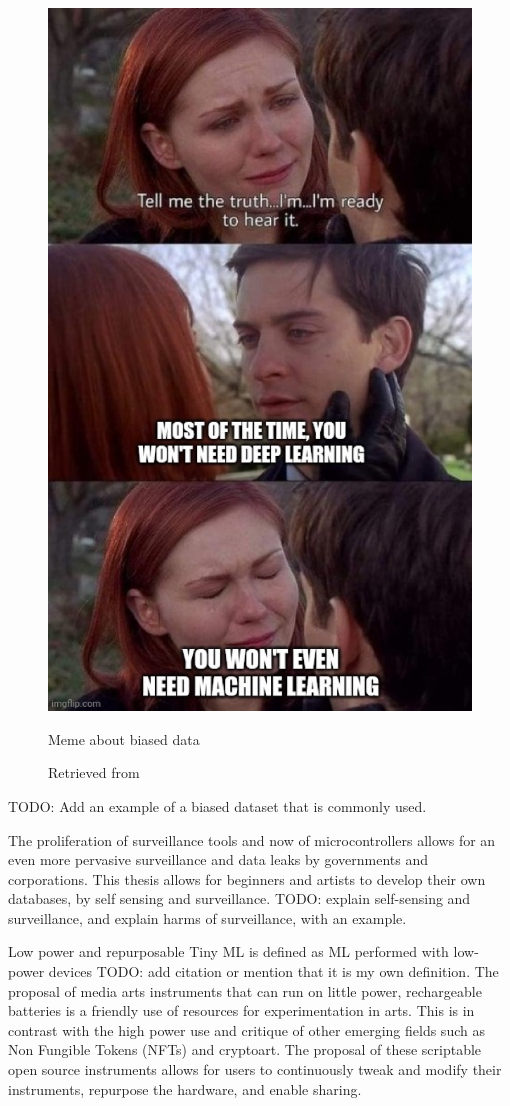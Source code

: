 \begin{figure}[ht]
  \centering
  \includegraphics[width=0.75\linewidth,height=0.25\textheight,keepaspectratio]{images/meme-spider-man.jpg}
  \caption{Meme about biased data}
  \caption*{Retrieved from \cite{website-twitter-dynamicwebpaige-meme}}
  \label{fig:meme-spider-man}
\end{figure}

TODO: Add an example of a biased dataset that is commonly used.

The proliferation of surveillance tools and now of microcontrollers allows for an even more pervasive surveillance and data leaks by governments and corporations. This thesis allows for beginners and artists to develop their own databases, by self sensing and surveillance. TODO: explain self-sensing and surveillance, and explain harms of surveillance, with an example.

Low power and repurposable
Tiny \acrshort{ML} is defined as \acrshort{ML} performed with low-power devices TODO: add citation or mention that it is my own definition. The proposal of media arts instruments that can run on little power, rechargeable batteries is a friendly use of resources for experimentation in arts. This is in contrast with the high power use and critique of other emerging fields such as Non Fungible Tokens (NFTs) and cryptoart. The proposal of these scriptable open source instruments allows for users to continuously tweak and modify their instruments, repurpose the hardware, and enable sharing.

